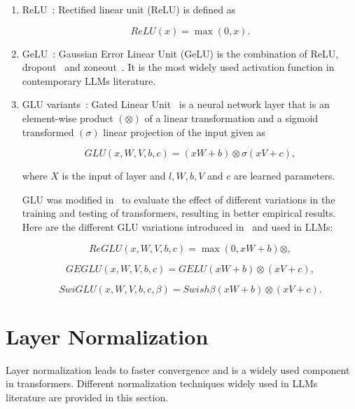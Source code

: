 \documentclass[a4paper,oneside]{book}
\begin{document}
\begin{enumerate}
    \item ReLU~\cite{nair2010rectified}: Rectified linear unit (ReLU) is defined as

          \begin{equation}
              ReLU(x)=\max(0, x).
          \end{equation}

    \item GeLU~\cite{hendrycks2016gaussian}: Gaussian Error Linear Unit (GeLU) is the combination of ReLU, dropout~\cite{srivastava2014dropout} and zoneout~\cite{krueger2016zoneout}. It is the most widely used activation function in contemporary LLMs literature.

    \item GLU variants~\cite{shazeer2020glu}: Gated Linear Unit~\cite{dauphin2017language} is a neural network layer that is an element-wise product $(\otimes)$ of a linear transformation and a sigmoid transformed $(\sigma)$ linear projection of the input given as

          \begin{equation}
              GLU(x, W, V, b, c)=(xW + b) \otimes \sigma(xV + c),
          \end{equation}

          where $X$ is the input of layer and $l, W, b, V$ and $c$ are learned parameters.

          GLU was modified in~\cite{shazeer2020glu} to evaluate the effect of different variations in the training and testing of transformers, resulting in better empirical results. Here are the different GLU variations introduced in~\cite{shazeer2020glu} and used in LLMs:

          \begin{equation}
              ReGLU(x, W, V, b, c) = \max (0, xW + b) \otimes,
          \end{equation}

          \begin{equation}
              GEGLU(x, W, V, b, c) = GELU(xW + b) \otimes(xV + c),
          \end{equation}

          \begin{equation}
              SwiGLU(x, W, V, b, c, \beta) = Swish \beta(xW + b) \otimes(xV + c).
          \end{equation}
\end{enumerate}

\section{Layer Normalization}
Layer normalization leads to faster convergence and is a widely used component in transformers. Different normalization techniques widely used in LLMs literature are provided in this section.
\end{document}
